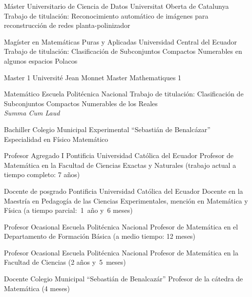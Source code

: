 \documentclass[
	a4paper,
	maincolor=cvblue!70!blue,
	sidecolor=gray!30,
	sectioncolor=cvblue!70!blue,
    sidebarwidth=7.5cm,
	topbottommargin=20pt,
	leftrightmargin=20pt,
]{fortysecondscv}
\begin{document}
\makefrontsidebar

    {Máster Universitario de Ciencia de Datos}
    {Universitat Oberta de Catalunya}
    {\hspace{0pt}\\[-1mm] Trabajo de titulación: Reconocimiento automático de imágenes para reconstrucción de redes planta-polinizador\\[-1.5mm]}

    {Magíster en Matemáticas Puras y Aplicadas}
    {Universidad Central del Ecuador}
    {\hspace{0pt}\\[-1mm] Trabajo de titulación: Clasificación de Subconjuntos Compactos Numerables en algunos espacios Polacos}

    {Master 1}
    {Université Jean Monnet}
    {Master Mathematiques 1}
    
    {Matemático}
    {Escuela Politécnica Nacional}
    {Trabajo de titulación: Clasificación de Subconjuntos Compactos Numerables de los Reales\\ \textit{Summa Cum Laud}}
    
    {Bachiller}
    {Colegio Municipal Experimental ``Sebastián de Benalcázar''}
    {Especialidad en Físico Matemático}

    {Profesor Agregado I}
    {Pontificia Universidad Católica del Ecuador}
    {Profesor de Matemática en la Facultad de Ciencias Exactas y Naturales (trabajo actual a tiempo completo: 7 años)}
    
    {Docente de posgrado}
    {Pontificia Universidad Católica del Ecuador}
    {Docente en la Maestría en Pedagogía de las Ciencias Experimentales, mención en Matemática y Física (a tiempo parcial:~1~año y~6 meses)}

    {Profesor Ocasional}
    {Escuela Politécnica Nacional}
    {Profesor de Matemática en el Departamento de Formación Básica (a medio tiempo: 12 meses)}

    {Profesor Ocasional}
    {Escuela Politécnica Nacional}
    {Profesor de Matemática en la Facultad de Ciencias (2 años y~5~meses)}

    {Docente}
    {Colegio Municipal ``Sebastián de Benalcazár''}
    {Profesor de la cátedra de Matemática (4 meses)}
\end{document}

